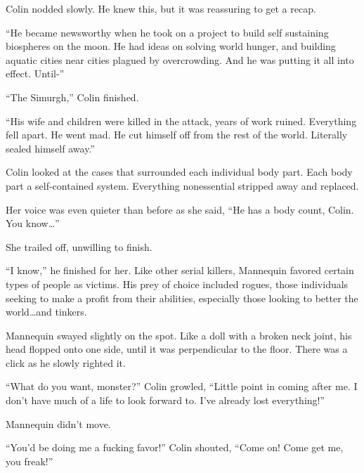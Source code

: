 Colin nodded slowly.  He knew this, but it was reassuring to get a recap.



``He became newsworthy when he took on a project to build self sustaining biospheres on the moon.  He had ideas on solving world hunger, and building aquatic cities near cities plagued by overcrowding.  And he was putting it all into effect.  Until-''



``The Simurgh,'' Colin finished.



``His wife and children were killed in the attack, years of work ruined.  Everything fell apart.  He went mad.  He cut himself off from the rest of the world.  Literally sealed himself away.''



Colin looked at the cases that surrounded each individual body part.  Each body part a self-contained system.  Everything nonessential stripped away and replaced.



Her voice was even quieter than before as she said, ``He has a body count, Colin.  You know\ldots''



She trailed off, unwilling to finish.



``I know,'' he finished for her.  Like other serial killers, Mannequin favored certain types of people as victims.  His prey of choice included rogues, those individuals seeking to make a profit from their abilities, especially those looking to better the world\ldots and tinkers.



Mannequin swayed slightly on the spot.  Like a doll with a broken neck joint, his head flopped onto one side, until it was perpendicular to the floor.  There was a click as he slowly righted it.



``What do you want, monster?''  Colin growled, ``Little point in coming after me.  I don't have much of a life to look forward to.  I've already lost everything!''



Mannequin didn't move.



``You'd be doing me a fucking favor!'' Colin shouted, ``Come on!  Come get me, you freak!''



